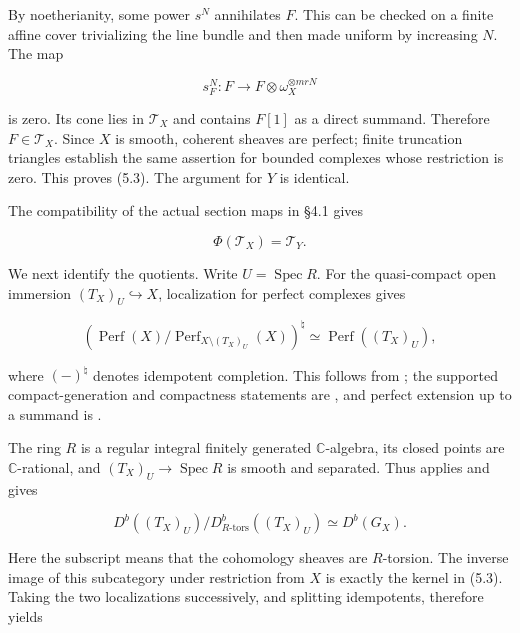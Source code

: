 \documentclass[11pt,a4paper]{article}
\begin{document}
By noetherianity, some power $s^N$ annihilates $F$. This can be checked on a finite affine cover trivializing the line bundle and then made uniform by increasing $N$. The map

\begin{equation*}
s_F^N:F\longrightarrow F\otimes\omega_X^{\otimes mrN}
\end{equation*}

is zero. Its cone lies in $\mathcal T_X$ and contains $F[1]$ as a direct summand. Therefore $F\in\mathcal T_X$. Since $X$ is smooth, coherent sheaves are perfect; finite truncation triangles establish the same assertion for bounded complexes whose restriction is zero. This proves (5.3). The argument for $Y$ is identical.

The compatibility of the actual section maps in \S{}4.1 gives

\begin{equation*}
\Phi(\mathcal T_X)=\mathcal T_Y.
\tag{5.4}
\end{equation*}

We next identify the quotients. Write $U=\operatorname{Spec}R$. For the quasi-compact open immersion $(T_X)_U\hookrightarrow X$, localization for perfect complexes gives

\begin{equation*}
\left(
\operatorname{Perf}(X)/
\operatorname{Perf}_{X\setminus(T_X)_U}(X)
\right)^{\natural}
\simeq\operatorname{Perf}((T_X)_U),
\tag{5.5}
\end{equation*}

where $(-)^{\natural}$ denotes idempotent completion. This follows from \cite[Theorem 2.1]{Nee92}; the supported compact-generation and compactness statements are \cite[Tags 0A9A and 0A9B]{Stacks}, and perfect extension up to a summand is \cite[Tag 09IM]{Stacks}.

The ring $R$ is a regular integral finitely generated $\mathbb C$-algebra, its closed points are $\mathbb C$-rational, and $(T_X)_U\to\operatorname{Spec}R$ is smooth and separated. Thus \cite[Corollary 2.6]{Mor25} applies and gives

\begin{equation*}
D^b((T_X)_U)/D^b_{R\text{-tors}}((T_X)_U)
\simeq D^b(G_X).
\tag{5.6}
\end{equation*}

Here the subscript means that the cohomology sheaves are $R$-torsion. The inverse image of this subcategory under restriction from $X$ is exactly the kernel in (5.3). Taking the two localizations successively, and splitting idempotents, therefore yields
\end{document}
